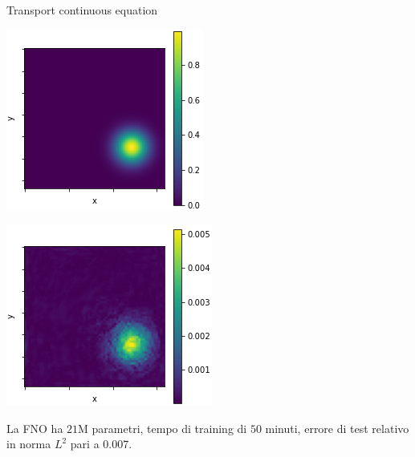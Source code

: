 \documentclass[aspectratio=169]{beamer}
\begin{document}
\begin{frame}[t]{Transport continuous equation}
\begin{center}
\begin{minipage}{0.24\textwidth}
        \end{minipage}
        \hfill
        \begin{minipage}{0.24\textwidth}
            \includegraphics[width=\textwidth]{operators/contTrans/FNOappro.png}
        \end{minipage}
        \hfill
        \begin{minipage}{0.24\textwidth}
            \includegraphics[width=\textwidth]{operators/contTrans/error.png}
        \end{minipage}
    \end{center}
    La FNO ha $21$M parametri, tempo di training di $50$ minuti, errore di test relativo in norma $L^{2}$ pari a $0.007$.
\end{frame}
\end{document}
